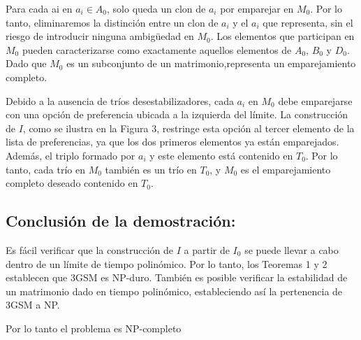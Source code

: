\documentclass{article}
\begin{document}
Para cada ai en $a_i \in A_0$, solo queda un clon de $a_i$ por emparejar en $M_0$.
Por lo tanto, eliminaremos la distinción entre un clon de $a_i$ y el $a_i$ que representa,
sin el riesgo de introducir ninguna ambigüedad en $M_0$.
Los elementos que participan en $M_0$ pueden caracterizarse como
exactamente aquellos elementos de $A_0$, $B_0$ y $D_0$.
Dado que $M_0$ es un subconjunto de un matrimonio,representa un emparejamiento completo.


Debido a la ausencia de tríos desestabilizadores,
cada $a_i$ en $M_0$ debe emparejarse con una opción 
de preferencia ubicada a la izquierda del límite. 
La construcción de $I$, como se ilustra en la Figura 3, 
restringe esta opción al tercer elemento de la lista de preferencias, 
ya que los dos primeros elementos ya están emparejados. 
Además, el triplo formado por $a_i$ y este elemento está contenido en
$T_0$. 
Por lo tanto, cada trío en $M_0$ también es un trío en $T_0$, y $M_0$
es el emparejamiento completo deseado contenido en $T_0$.

\subsection{Conclusión de la demostración:}
Es fácil verificar que la construcción de
$I$ a partir de $I_0$ se puede llevar a cabo
dentro de un límite de tiempo polinómico.
Por lo tanto, los Teoremas 1 y 2 establecen que
3GSM es NP-duro.
También es posible verificar la estabilidad de un
matrimonio dado en tiempo polinómico, 
estableciendo así la pertenencia de 3GSM a NP.

Por lo tanto el problema es NP-completo
\end{document}
